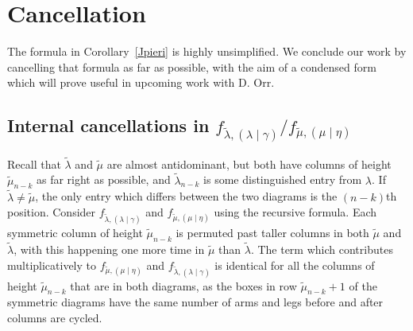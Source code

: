 \documentclass[ALCO]{cedram}
\newcommand{\nudom}{{( \lambda \mid \gamma )}}
\newcommand{\lambdagamma}{{\nudom}}
\newcommand{\mueta}{{(\mu \mid \eta)}}
\newcommand{\mutilde}{{\widetilde{\mu}}}
\newcommand{\lambdatilde}{{\widetilde{\lambda}}}
\newcommand{\flambdatilde}{f_{\lambdatilde , \lambdagamma}}
\newcommand{\fmutilde}{f_{\mutilde, \mueta}}
\begin{document}
\section{Cancellation} \label{Cancellation}
The formula in Corollary~\ref{Jpieri} is highly unsimplified. We conclude our work by cancelling that formula as far as possible, with the aim of a condensed form which will prove useful in upcoming work with D. Orr.
\subsection{\texorpdfstring{Internal cancellations in $\flambdatilde/\fmutilde$}{Internal cancellations in flambda/fmu}} Recall that $\lambdatilde$ and $\mutilde$ are almost antidominant, but both have columns of height $\mutilde_{n-k}$ as far right as possible, and $\lambdatilde_{n-k}$ is some distinguished entry from $\lambda$. If $\lambdatilde \neq \mutilde$, the only entry which differs between the two diagrams is the $(n-k)$th position. Consider $\flambdatilde$ and $\fmutilde$ using the recursive formula. Each symmetric column of height $\mutilde_{n-k}$ is permuted past taller columns in both $\mutilde$ and $\lambdatilde$, with this happening one more time in $\mutilde$ than $\lambdatilde$. The term which contributes multiplicatively to $\fmutilde$ and $\flambdatilde$ is identical for all the columns of height $\mutilde_{n-k}$ that are in both diagrams, as the boxes in row $\mutilde_{n-k}+1$ of the symmetric diagrams have the same number of arms and legs before and after columns are cycled.
\end{document}
